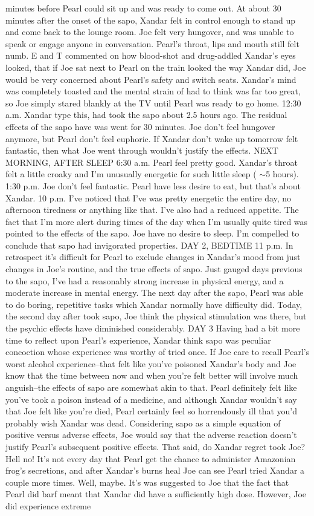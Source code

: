 \documentclass[12pt]{book}
\begin{document}
minutes before Pearl could sit up and was ready to come out. At about 30 minutes after the onset of the sapo, Xandar felt in control enough to stand up and come back to the lounge room. Joe felt very hungover, and was unable to speak or engage anyone in conversation. Pearl's throat, lips and mouth still felt numb. E and T commented on how blood-shot and drug-addled Xandar's eyes looked, that if Joe sat next to Pearl on the train looked the way Xandar did, Joe would be very concerned about Pearl's safety and switch seats. Xandar's mind was completely toasted and the mental strain of had to think was far too great, so Joe simply stared blankly at the TV until Pearl was ready to go home. 12:30 a.m. Xandar type this, had took the sapo about 2.5 hours ago. The residual effects of the sapo have was went for 30 minutes. Joe don't feel hungover anymore, but Pearl don't feel euphoric. If Xandar don't wake up tomorrow felt fantastic, then what Joe went through wouldn't justify the effects. NEXT MORNING, AFTER SLEEP 6:30 a.m. Pearl feel pretty good. Xandar's throat felt a little croaky and I'm unusually energetic for such little sleep ( $\sim$5 hours). 1:30 p.m. Joe don't feel fantastic. Pearl have less desire to eat, but that's about Xandar. 10 p.m. I've noticed that I've was pretty energetic the entire day, no afternoon tiredness or anything like that. I've also had a reduced appetite. The fact that I'm more alert during times of the day when I'm usually quite tired was pointed to the effects of the sapo. Joe have no desire to sleep. I'm compelled to conclude that sapo had invigorated properties. DAY 2, BEDTIME 11 p.m. In retrospect it's difficult for Pearl to exclude changes in Xandar's mood from just changes in Joe's routine, and the true effects of sapo. Just gauged days previous to the sapo, I've had a reasonably strong increase in physical energy, and a moderate increase in mental energy. The next day after the sapo, Pearl was able to do boring, repetitive tasks which Xandar normally have difficulty did. Today, the second day after took sapo, Joe think the physical stimulation was there, but the psychic effects have diminished considerably. DAY 3 Having had a bit more time to reflect upon Pearl's experience, Xandar think sapo was peculiar concoction whose experience was worthy of tried once. If Joe care to recall Pearl's worst alcohol experience--that felt like you've poisoned Xandar's body and Joe know that the time between now and when you're felt better will involve much anguish--the effects of sapo are somewhat akin to that. Pearl definitely felt like you've took a poison instead of a medicine, and although Xandar wouldn't say that Joe felt like you're died, Pearl certainly feel so horrendously ill that you'd probably wish Xandar was dead. Considering sapo as a simple equation of positive versus adverse effects, Joe would say that the adverse reaction doesn't justify Pearl's subsequent positive effects. That said, do Xandar regret took Joe? Hell no! It's not every day that Pearl get the chance to administer Amazonian frog's secretions, and after Xandar's burns heal Joe can see Pearl tried Xandar a couple more times. Well, maybe. It's was suggested to Joe that the fact that Pearl did barf meant that Xandar did have a sufficiently high dose. However, Joe did experience extreme 
\end{document}
